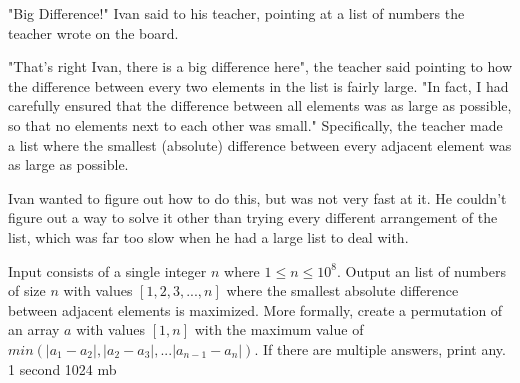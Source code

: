 {"Big Difference!" Ivan said to his teacher, pointing at a list of numbers the teacher wrote on the board.

"That's right Ivan, there is a big difference here", the teacher said pointing to how the difference between every two elements in the list is fairly large. "In fact, I had carefully ensured that the difference between all elements was as large as possible, so that no elements next to each other was small." Specifically, the teacher made a list where the smallest (absolute) difference between every adjacent element was as large as possible.

Ivan wanted to figure out how to do this, but was not very fast at it. He couldn't figure out a way to solve it other than trying every different arrangement of the list, which was far too slow when he had a large list to deal with.}
{Input consists of a single integer $n$ where $1 \le n \le 10^8$.}
{Output an list of numbers of size $n$ with values $[1,2,3,...,n]$ where the smallest absolute difference between adjacent elements is maximized. More formally, create a permutation of an array $a$ with values $[1,n]$ with the maximum value of $min(|a_1-a_2|, |a_2-a_3|, ... |a_{n-1}-a_{n}|)$. If there are multiple answers, print any.}
{1 second}
{1024 mb}
{
}